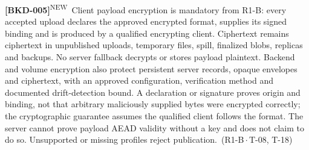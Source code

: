 \documentclass[11pt,a4paper]{article}
\newcommand{\reqtag}[2]{{\footnotesize\color{accent}(#1\,$\cdot$\,#2)}}
\newcommand{\reqn}[4]{\par\noindent\hypertarget{req:#1}{\textbf{[#1]}}\textsuperscript{\color{accent}\tiny NEW}\ #4\ \reqtag{#2}{#3}\par}
\begin{document}
\reqn{BKD-005}{R1-B}{T-08, T-18}{Client payload encryption is mandatory from R1-B: every accepted upload declares the approved encrypted format, supplies its signed binding and is produced by a qualified encrypting client. Ciphertext remains ciphertext in unpublished uploads, temporary files, spill, finalized blobs, replicas and backups. No server fallback decrypts or stores payload plaintext. Backend and volume encryption also protect persistent server records, opaque envelopes and ciphertext, with an approved configuration, verification method and documented drift-detection bound. A declaration or signature proves origin and binding, not that arbitrary maliciously supplied bytes were encrypted correctly; the cryptographic guarantee assumes the qualified client follows the format. The server cannot prove payload AEAD validity without a key and does not claim to do so. Unsupported or missing profiles reject publication.}
\end{document}
